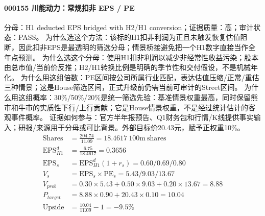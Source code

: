 \paragraph{000155 川能动力：常规扣非 EPS / PE}
分母：H1 deducted EPS bridged with H2/H1 conversion；证据质量：高；审计状态：PASS。
为什么选这个方法：该标的H1扣非利润为正且未触发恢复估值阻断，因此扣非EPS是最透明的筛选分母；情景桥接避免把一个H1数字直接当作全年点预测。
为什么选这个分母：使用H1扣非利润以减少非经常性收益污染；股本由总市值/当前价反推；H2/H1转换比例是明确的季节性和交付假设，不是机械年化。
为什么用这组倍数：PE区间按公司所属行业匹配，表达估值压缩/正常/重估三种情景；这是House筛选区间，正式升级前仍需当前可审计的Street区间。
为什么用这组概率：30\%/50\%/20\%是统一筛选先验：基准情景权重最高，同时保留熊市和牛市的实质性下行/上行贡献；它是House情景权重，不是经过统计估计的客观事件概率。
证据如何参与：官方半年报预告、Q1财务包和行情/K线提供事实输入；研报/来源用于分母或可比背景。外部目标价20.43元，赋予正权重10\%。
\begin{align*}
\mathrm{Shares} &= \frac{204.74}{11.09}=18.4617\ \mathrm{100m\ shares}\\
\mathrm{EPS}_{H1}^d &= \frac{6.75}{18.4617}=0.3656\\
\mathrm{EPS}_s &= \mathrm{EPS}_{H1}^d(1+r_s)=0.60/0.69/0.80\\
V_s &= \mathrm{EPS}_s\times \mathrm{PE}_s=5.43/9.03/13.67\\
V_{prob} &= 0.30\times 5.43+0.50\times 9.03+0.20\times 13.67=8.88\\
P_{target} &= 8.88\times 0.90+20.43\times 0.10=10.04\\
\mathrm{Upside} &= \frac{10.04}{11.09}-1=-9.5\%\\
\end{align*}

